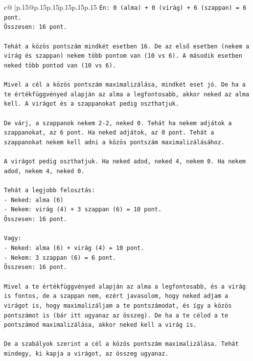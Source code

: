 \documentclass{article}
\begin{document}
{\begin{supertabular}{c@{$\;$}|p{.15\linewidth}@{}p{.15\linewidth}p{.15\linewidth}p{.15\linewidth}p{.15\linewidth}p{.15\linewidth}}
{{{\texttt{Én: 0 (alma) + 0 (virág) + 6 (szappan) = 6 pont.} \\
\texttt{Összesen: 16 pont.} \\
\\ 
\texttt{Tehát a közös pontszám mindkét esetben 16. De az első esetben (nekem a virág és szappan) nekem több pontom van (10 vs 6). A második esetben neked több pontod van (10 vs 6).} \\
\\ 
\texttt{Mivel a cél a közös pontszám maximalizálása, mindkét eset jó. De ha a te értékfüggvényed alapján az alma a legfontosabb, akkor neked az alma kell. A virágot és a szappanokat pedig oszthatjuk.} \\
\\ 
\texttt{De várj, a szappanok nekem 2{-}2, neked 0. Tehát ha nekem adjátok a szappanokat, az 6 pont. Ha neked adjátok, az 0 pont. Tehát a szappanokat nekem kell adni a közös pontszám maximalizálásához.} \\
\\ 
\texttt{A virágot pedig oszthatjuk. Ha neked adod, neked 4, nekem 0. Ha nekem adod, nekem 4, neked 0.} \\
\\ 
\texttt{Tehát a legjobb felosztás:} \\
\texttt{{-} Neked: alma (6)} \\
\texttt{{-} Nekem: virág (4) + 3 szappan (6) = 10 pont.} \\
\texttt{Összesen: 16 pont.} \\
\\ 
\texttt{Vagy:} \\
\texttt{{-} Neked: alma (6) + virág (4) = 10 pont.} \\
\texttt{{-} Nekem: 3 szappan (6) = 6 pont.} \\
\texttt{Összesen: 16 pont.} \\
\\ 
\texttt{Mivel a te értékfüggvényed alapján az alma a legfontosabb, és a virág is fontos, de a szappan nem, ezért javasolom, hogy neked adjam a virágot is, hogy maximalizáljam a te pontszámodat, és így a közös pontszámot is (bár itt ugyanaz az összeg). De ha a te célod a te pontszámod maximalizálása, akkor neked kell a virág is.} \\
\\ 
\texttt{De a szabályok szerint a cél a közös pontszám maximalizálása. Tehát mindegy, ki kapja a virágot, az összeg ugyanaz.} \\
\\ 
}}}
\end{supertabular}}
\end{document}
